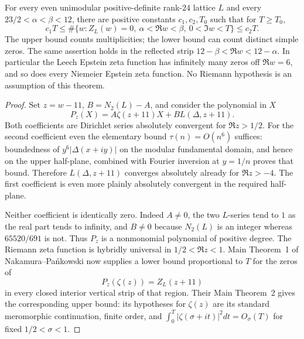 \begin{theorem}
\label{thm:niemeier-offline}
For every even unimodular positive-definite rank-$24$ lattice $L$ and every
$23/2<\alpha<\beta<12$, there are positive constants $c_1,c_2,T_0$ such that
for $T\geq T_0$,
\[
 c_1T\leq\#\{w:Z_L(w)=0,\ \alpha<\Re w<\beta,\ 0<\Im w<T\}
       \leq c_2T.
\]
The upper bound counts multiplicities; the lower bound can count distinct
simple zeros.  The same assertion holds in the reflected strip
$12-\beta<\Re w<12-\alpha$.
In particular the Leech Epstein zeta function has infinitely many zeros
off $\Re w=6$, and so does every Niemeier Epstein zeta function.
No Riemann hypothesis is an assumption of this theorem.
\end{theorem}
\begin{proof}
Set $z=w-11$, $B=N_2(L)-A$, and consider the polynomial in $X$
\begin{equation}\label{eq:niemeier-hybrid-polynomial}
 P_z(X)=A\zeta(z+11)X+B L(\Delta,z+11).
\end{equation}
Both coefficients are Dirichlet series absolutely convergent for
$\Re z>1/2$.  For the second coefficient even the elementary bound
$\tau(n)=O(n^6)$ suffices: boundedness of
$y^6|\Delta(x+iy)|$ on the modular fundamental domain, and hence on the
upper half-plane, combined with Fourier inversion at $y=1/n$ proves that
bound.  Therefore $L(\Delta,z+11)$ converges absolutely already for
$\Re z>-4$.  The first coefficient is even more plainly absolutely
convergent in the required half-plane.

Neither coefficient is identically zero.  Indeed $A\ne0$, the two
$L$-series tend to $1$ as the real part tends to infinity, and
$B\ne0$ because $N_2(L)$ is an integer whereas $65520/691$ is not.
Thus $P_z$ is a nonmonomial polynomial of positive degree.
The Riemann zeta function is hybridly universal in
$1/2<\Re z<1$.  Main Theorem~1 of Nakamura--Pa\'nkowski
\cite[arXiv v4, p.~4]{NP2016} now supplies a lower bound proportional to
$T$ for the zeros of
\[
 P_z(\zeta(z))=Z_L(z+11)
\]
in every closed interior vertical strip of that region.
Their Main Theorem~2 gives the corresponding upper bound: its hypotheses
for $\zeta(z)$ are its standard meromorphic continuation, finite order,
and $\int_0^T|\zeta(\sigma+it)|^2dt=O_\sigma(T)$ for fixed
$1/2<\sigma<1$.


\end{proof}
